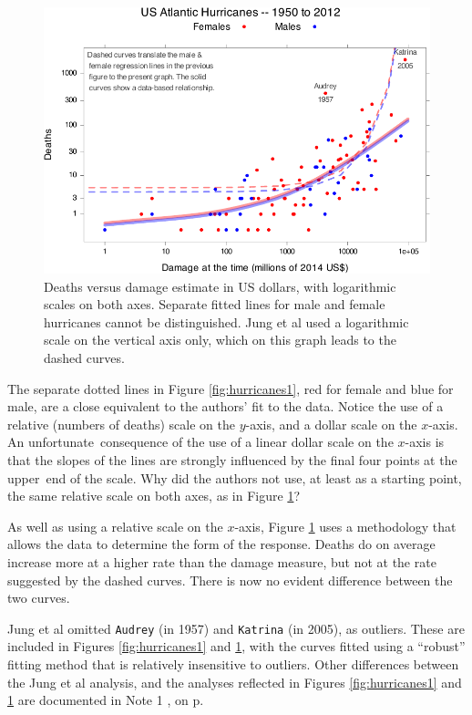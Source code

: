 \documentclass[
  10pt,
  b5paper]{book}
\begin{document}
\begin{figure}[H]

{\centering \includegraphics[width=0.8\linewidth]{07-regress_files/figure-latex/hurricanes2-1} 

}

\caption{Deaths versus damage estimate in US dollars, with logarithmic scales
               on both axes. Separate fitted lines for male and female
               hurricanes cannot be distinguished. Jung et al used a 
               logarithmic scale on the vertical axis only, which on
               this graph leads to the dashed curves.}\label{fig:hurricanes2}
\end{figure}

The separate dotted lines in Figure \ref{fig:hurricanes1}, red for
female and blue for male, are a close equivalent to the authors' fit
to the data. Notice the use of a relative (numbers of deaths) scale
on the \(y\)-axis, and a dollar scale on the \(x\)-axis.
An unfortunate~consequence of the use of a linear dollar scale
on the \(x\)-axis is that the slopes of the lines are strongly
influenced by the final four points at the upper~end of the scale.
Why did the authors not use, at least as a starting point, the same relative scale on both axes, as in Figure
\ref{fig:hurricanes2}?

As well as using a relative scale on the \(x\)-axis, Figure
\ref{fig:hurricanes2} uses a methodology that allows the
data to determine the form of the response. Deaths do on
average increase more at a higher rate than the damage measure,
but not at the rate suggested by the dashed curves. There
is now no evident difference between the two curves.

Jung et al omitted \texttt{Audrey} (in 1957) and \texttt{Katrina} (in 2005), as
outliers. These are included in Figures \ref{fig:hurricanes1} and \ref{fig:hurricanes2}, with the curves fitted using a ``robust''
fitting method that is relatively insensitive to outliers.
Other differences between the Jung et al analysis, and the
analyses reflected in Figures \ref{fig:hurricanes1} and
\ref{fig:hurricanes2} are documented in Note 1
, on p.~\pageref{hurricanes}
\end{document}
